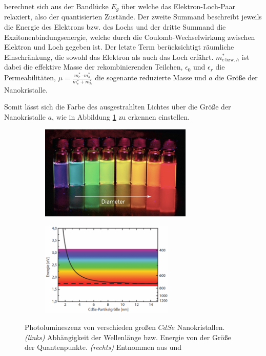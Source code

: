       berechnet sich aus der Bandlücke $E_g$ über welche das Elektron-Loch-Paar relaxiert, also der quantisierten Zustände. Der zweite Summand beschreibt jeweils die Energie des Elektrons bzw. des Lochs und der dritte Summand die Exzitonenbindungsenergie, welche durch die Coulomb-Wechselwirkung zwischen Elektron und Loch gegeben ist. Der letzte Term berücksichtigt räumliche Einschränkung, die sowohl das Elektron als auch das Loch erfährt.
      $m_{e\,\text{bzw.}\,h}^*$ ist dabei die effektive Masse der rekombinierenden Teilchen, $\epsilon_0$ und $\epsilon_r$ die Permeabilitäten, $\mu=\frac{m_e^*\cdot m_h^*}{m_e^* + m_h^*}$ die sogenante reduzierte Masse und $a$ die Größe der Nanokristalle.

      Somit lässt sich die Farbe des ausgestrahlten Lichtes über die Größe der Nanokristalle $a$, wie in Abbildung \ref{fig:Farbe} zu erkennen einstellen.
      \begin{figure}[h]
        \begin{subfigure}{0.48\textwidth}
          \centering
          \includegraphics[height=4.5cm]{pictures/Farbe.png}
        \end{subfigure}
        \hfill
        \begin{subfigure}{0.48\textwidth}
          \centering
          \includegraphics[height=4.5cm]{pictures/Farbe2.png}
        \end{subfigure}
        \caption{Photolumineszenz von verschieden großen $CdSe$ Nanokristallen. \textit{(links)} Abhängigkeit der Wellenlänge bzw. Energie von der Größe der Quantenpunkte. \textit{(rechts)} Entnommen aus \cite{7242091} und \cite{braam}}
        \label{fig:Farbe}
      \end{figure}
